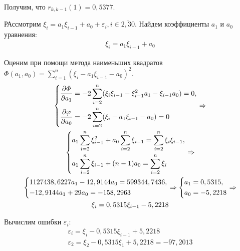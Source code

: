 \documentclass[utf8, a4paper, 14pt, russian, oneside]{book}
\begin{document}
Получим, что $r_{k, k-1}(1) = 0,5377$.


РАссмотрим $\xi_i = a_1 \xi_{i-1} + a_0 + \varepsilon_i, i \in \overline{2, 30}$. Найдем коэффициенты $a_1$ и $a_0$ уравнения:
\begin{gather*}
    \xi_i = a_1 \xi_{i-1} + a_0
\end{gather*}

Оценим при помощи метода наименьших квадратов $\varPhi(a_1, a_0) = \sum\limits_{i=1}^n (\xi_i - a_1\xi_{i-1} - a_0)^2$.
\begin{gather*}
    \begin{dcases}
         \frac{\partial \varPhi}{\partial a_1}  = -2 \sum\limits_{i=2}^n(\xi_i \xi_{i-1} - \xi_{i-1}^2 a_1 - \xi_{i-1}a_0) = 0, \\
         \frac{\partial \varphi}{\partial a_0}  = -2 \sum\limits_{i=2}^n (\xi_i - a_1\xi_{i-1} - a_0) = 0
    \end{dcases}
    \Rightarrow \\
    \begin{dcases}
        a_1 \sum\limits_{i=2}^n\xi_{i-1}^2 + a_0\sum\limits_{i=2}^n\xi_{i-1} = \sum\limits_{i=2}^n \xi_i \xi_{i-1}, \\
        a_1 \sum\limits_{i=2}^n \xi_{i-1} + (n-1)a_0 = \sum\limits_{i=2}^n\xi_i
    \end{dcases}
    \Rightarrow \\
    \begin{dcases}
        1127438,6227 a_1 -12,9144 a_0 = 599344,7436, \\
        -12,9144a_1 + 29a_0 = -158,2963
    \end{dcases}
    \Rightarrow
    \begin{dcases}
        a_1 = 0,5315, \\
        a_0 = -5,2218
    \end{dcases}
    \Rightarrow \\
    \xi_i = 0,5315 \xi_{i-1} -5,2218
\end{gather*}

Вычислим ошибки $\varepsilon_i$:
\begin{gather*}
    \varepsilon_i = \xi_i - 0,5315\xi_{i-1} + 5,2218 \\
    \varepsilon_2 = \xi_2 - 0,5315\xi_{1} + 5,2218 = -97,2013
\end{gather*}
\end{document}
